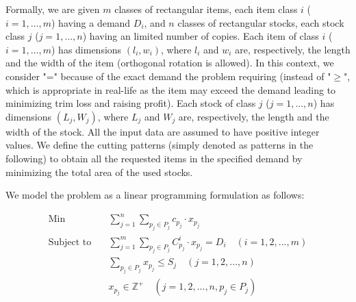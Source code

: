 \documentclass[a4paper]{article}
\begin{document}
\noindent Formally, we are given \( m \) classes of rectangular items, each item class \( i \) (\( i = 1, \dots, m \)) having a demand \( D_i \), and \( n \) classes of rectangular stocks, each stock class \( j \) (\( j = 1, \dots, n \)) having an limited number of copies. Each item of class \( i \) (\( i = 1, \dots, m \)) has dimensions \( (l_i, w_i) \), where \( l_i \) and \( w_i \) are, respectively, the length and the width of the item (orthogonal rotation is allowed). In this context, we consider "=" because of the exact demand the problem requiring (instead of "\(\geq\)", which is appropriate in real-life as the item may exceed the demand leading to minimizing trim loss and raising profit). Each stock of class \( j \) (\( j = 1, \dots, n \)) has dimensions \( (L_j, W_j) \), where \( L_j \) and \( W_j \) are, respectively, the length and the width of the stock. All the input data are assumed to have positive integer values. We define the cutting patterns (simply denoted as patterns in the following) to obtain all the requested items in the specified demand by minimizing the total area of the used stocks.

\vspace{0.1cm}

\noindent We model the problem as a linear programming formulation as follows:

\begin{align}
\text{Min} \quad & \sum_{j=1}^{n} \sum_{p_j \in P_j} c_{p_j} \cdot x_{p_j}\\
\text{Subject to} \quad & \sum_{j=1}^{m} \sum_{p_j \in P_j} C_{p_j}^i \cdot x_{p_j} = D_i \quad ( i = 1, 2, ..., m) \\ 
& \sum_{p_j \in P_j} x_{p_j} \le S_j \quad ( j = 1, 2, ..., n) \\ 
& x_{p_j} \in \mathbb{Z}^+ \quad ( j = 1, 2, ..., n, p_j \in P_j )
\end{align}
\end{document}
